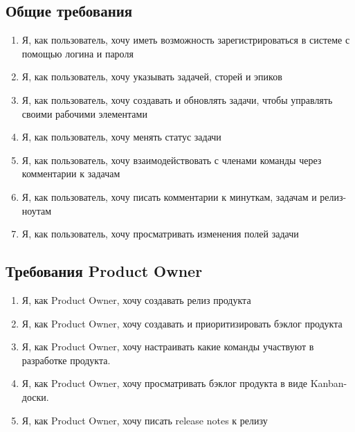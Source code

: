 \documentclass{article}
\begin{document}
\subsection{Общие требования}
\begin{enumerate}[label=\textbf{FR\arabic*}.]
	\item Я, как пользователь, хочу иметь возможность зарегистрироваться в системе с помощью логина и пароля
	\item Я, как пользователь, хочу указывать  задачей, сторей и эпиков
	\item Я, как пользователь, хочу создавать и обновлять задачи, чтобы управлять своими рабочими элементами
	\item Я, как пользователь, хочу менять статус задачи
	\item Я, как пользователь, хочу взаимодействовать с членами команды через
	      комментарии к задачам
	\item Я, как пользователь, хочу писать комментарии к минуткам, задачам и релиз-ноутам
	\item Я, как пользователь, хочу просматривать изменения полей задачи
\end{enumerate}

\subsection{Требования Product Owner}
\begin{enumerate}[label=\textbf{POR\arabic*}.]
	\item Я, как Product Owner, хочу создавать релиз продукта
	\item Я, как Product Owner, хочу создавать и приоритизировать бэклог продукта
	\item Я, как Product Owner, хочу настраивать какие команды участвуют в разработке продукта.
	\item Я, как Product Owner, хочу просматривать бэклог продукта в виде Kanban-доски.
	\item Я, как Product Owner, хочу писать release notes к релизу
\end{enumerate}
\end{document}
